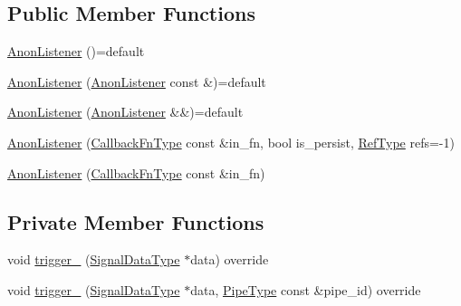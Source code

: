 \subsection*{Public Member Functions}
\begin{DoxyCompactItemize}
\item 
\hyperlink{structvt_1_1pipe_1_1callback_1_1_anon_listener_ad9ac07733e0f6500aa340c606370eef7}{Anon\+Listener} ()=default
\item 
\hyperlink{structvt_1_1pipe_1_1callback_1_1_anon_listener_aa118ce8196dc5ae4bcce9c076c13fe96}{Anon\+Listener} (\hyperlink{structvt_1_1pipe_1_1callback_1_1_anon_listener}{Anon\+Listener} const \&)=default
\item 
\hyperlink{structvt_1_1pipe_1_1callback_1_1_anon_listener_aa6d501a31dc807d01a6b71bc2011e90d}{Anon\+Listener} (\hyperlink{structvt_1_1pipe_1_1callback_1_1_anon_listener}{Anon\+Listener} \&\&)=default
\item 
\hyperlink{structvt_1_1pipe_1_1callback_1_1_anon_listener_afaa19c0b06e657dc701b60ebc9427b0d}{Anon\+Listener} (\hyperlink{structvt_1_1pipe_1_1callback_1_1_anon_listener_ad5d8a2cc6a1599642855e92bbd10f89c}{Callback\+Fn\+Type} const \&in\+\_\+fn, bool is\+\_\+persist, \hyperlink{namespacevt_a9b39ce9494bb04674d0d5b895a5aa50f}{Ref\+Type} refs=-\/1)
\item 
\hyperlink{structvt_1_1pipe_1_1callback_1_1_anon_listener_ad7eef759667c0dcff5506ab45e28eda4}{Anon\+Listener} (\hyperlink{structvt_1_1pipe_1_1callback_1_1_anon_listener_ad5d8a2cc6a1599642855e92bbd10f89c}{Callback\+Fn\+Type} const \&in\+\_\+fn)
\end{DoxyCompactItemize}
\subsection*{Private Member Functions}
\begin{DoxyCompactItemize}
\item 
void \hyperlink{structvt_1_1pipe_1_1callback_1_1_anon_listener_ae96641b0c7f934d693018d91cfa7add4}{trigger\+\_\+} (\hyperlink{structvt_1_1pipe_1_1callback_1_1_anon_listener_a26182294e0b15bb16dd94040bb47ed73}{Signal\+Data\+Type} $\ast$data) override
\item 
void \hyperlink{structvt_1_1pipe_1_1callback_1_1_anon_listener_a8694018348ea69945fbc090bced5d4aa}{trigger\+\_\+} (\hyperlink{structvt_1_1pipe_1_1callback_1_1_anon_listener_a26182294e0b15bb16dd94040bb47ed73}{Signal\+Data\+Type} $\ast$data, \hyperlink{namespacevt_ac9852acda74d1896f48f406cd72c7bd3}{Pipe\+Type} const \&pipe\+\_\+id) override
\end{DoxyCompactItemize}
